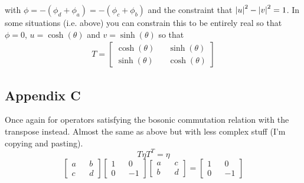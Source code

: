 \documentclass[12pt]{article}
\begin{document}
with $\phi = -(\phi_d+\phi_a)=-(\phi_c+\phi_b)$ and the constraint that $\abs{u}^2 - \abs{v}^2 = 1$. In some situations (i.e. above) you can constrain this to be entirely real so that $\phi=0$, $u=\cosh(\theta)$ and $v = \sinh(\theta)$ so that
\begin{align}
T=\begin{bmatrix}
\cosh(\theta) && \sinh(\theta)\\
\sinh(\theta) && \cosh(\theta)
\end{bmatrix}
\end{align}

\subsection{Appendix C}%
Once again for operators satisfying the bosonic commutation relation with the transpose instead. Almost the same as above but with less complex stuff (I'm copying and pasting).
\begin{equation}
T\eta T^T = \eta
\end{equation}
\begin{equation}
\begin{bmatrix}
a && b\\
c && d
\end{bmatrix}
\begin{bmatrix}
1 && 0\\
0 && -1
\end{bmatrix}
\begin{bmatrix}
a && c\\
b && d
\end{bmatrix}=
\begin{bmatrix}
1 && 0\\
0 && -1
\end{bmatrix}
\end{equation}
\end{document}
